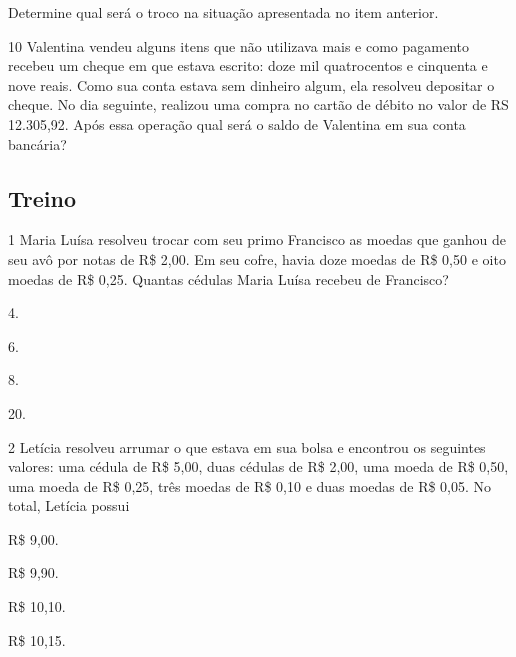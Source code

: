 \begin{mdframed}[linewidth=2pt,linecolor=salmao,roundcorner=2pt]
\begin{escolha}

\item
  Determine qual será o troco na situação apresentada no item anterior.

\end{escolha}

\num{10} Valentina vendeu alguns itens que não utilizava mais e como pagamento
recebeu um cheque em que estava escrito: doze mil quatrocentos e
cinquenta e nove reais. Como sua conta estava sem dinheiro algum, ela
resolveu depositar o cheque. No dia seguinte, realizou uma compra no
cartão de débito no valor de RS 12.305,92. Após essa operação qual será o
saldo de Valentina em sua conta bancária?

\begin{mdframed}[linewidth=2pt,linecolor=salmao,roundcorner=2pt]
\vspace{4cm}
\end{mdframed}

\subsection{Treino}

\num{1} Maria Luísa resolveu trocar com seu primo Francisco as moedas que ganhou de seu avô por notas de
R\$ 2,00. Em seu cofre, havia doze moedas de R\$ 0,50
e oito moedas de R\$ 0,25. Quantas cédulas Maria Luísa recebeu de Francisco?

\begin{escolha}
\item
  4.
\item
  6.
\item
  8.
\item
  20.
\end{escolha}


\num{2} Letícia resolveu arrumar o que estava em sua bolsa e encontrou
os seguintes valores: uma cédula de R\$ 5,00, duas cédulas de R\$ 2,00, uma moeda de R\$ 0,50, uma moeda de R\$ 0,25, três moedas de R\$ 0,10 e duas moedas de R\$ 0,05. No total, Letícia possui

\begin{escolha}
\item
  R\$ 9,00.
\item
  R\$ 9,90.
\item
  R\$ 10,10.
\item
  R\$ 10,15.
\end{escolha}



\end{mdframed}
